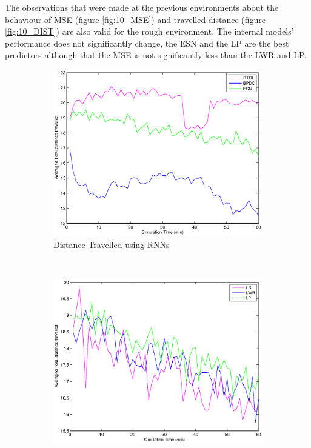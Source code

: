 \documentclass[msc,ai,logo]{infthesis}
\begin{document}
The observations that were made at the previous environments about the behaviour of MSE (figure \ref{fig:10_MSE}) and travelled distance (figure \ref{fig:10_DIST}) are also valid  for the rough environment. The internal models' performance does not significantly change, the ESN and the LP are the best predictors although that the MSE is not significantly less than the LWR and LP.


\begin{figure}[H]
        \centering
        \begin{subfigure}[b]{0.5\textwidth}
                \centering
                \includegraphics[width=\textwidth]{RNN_10_DIST.eps}
                \caption{Distance Travelled using RNNs}
              \label{fig:RNN_10_DIST}  
        \end{subfigure}%
        ~ %
        \begin{subfigure}[b]{0.5\textwidth}
                \centering
                \includegraphics[width=\textwidth]{LR_10_DIST.eps}

\end{subfigure}
\end{figure}
\end{document}
